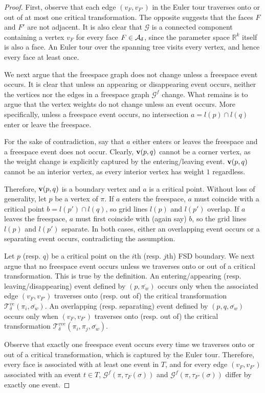\documentclass[thm-restate]{lipics-v2021}
\theoremstyle{remark}
\newcommand{\graph}[0]{\mathcal{G}}
\newcommand{\reals}[0]{\mathbb{R}}
\newcommand{\vertex}[1]{\normalfont \textbf{v}(#1)}
\newcommand{\fsgraph}[0]{\graph^{f}}
\newcommand{\vvetrans}[0]{\mathcal{T}^{vve}_\delta}
\newcommand{\vetrans}[0]{\mathcal{T}^{ve}_\delta}
\newcommand{\cseg}[1]{\overline{#1}}
\begin{document}
\begin{proof}
    First, observe that each edge $(v_F, v_{F'})$ in the Euler tour traverses onto or out of at most one critical transformation. The opposite suggests that the faces $F$ and $F'$ are not adjacent. It is also clear that $\graph$ is a connected component containing a vertex $v_F$ for every face $F \in \mathcal{A_\delta}$, since the parameter space $\reals^k$ itself is also a face. An Euler tour over the spanning tree visits every vertex, and hence every face at least once. 

    We next argue that the freespace graph does not change unless a freespace event occurs. It is clear that unless an appearing or disappearing event occurs, neither the vertices nor the edges in a freespace graph $\fsgraph$ change. What remains is to argue that the vertex weights do not change unless an event occurs. More specifically, unless a freespace event occurs, no intersection $a = l(p) \cap l(q)$ enter or leave the freespace. 

    For the sake of contradiction, say that $a$ either enters or leaves the freespace and a freespace event does not occur. Clearly, $\vertex{p, q}$ cannot be a corner vertex, as the weight change is explicitly captured by the entering/leaving event. $\vertex{p, q}$ cannot be an interior vertex, as every interior vertex has weight $1$ regardless. 
    
    Therefore, $\vertex{p, q}$ is a boundary vertex and $a$ is a critical point. Without loss of generality, let $p$ be a vertex of $\pi$. If $a$ enters the freespace, $a$ must coincide with a critical point $b = l(p') \cap l(q)$, so grid lines $l(p)$ and $l(p')$ overlap. If $a$ leaves the freespace, $a$ must first coincide with (again say) $b$, so the grid lines $l(p)$ and $l(p')$ separate. In both cases, either an overlapping event occurs or a separating event occurs, contradicting the assumption. 

    Let $p$ (resp. $q$) be a critical point on the $i$th (resp. $j$th) FSD boundary. We next argue that no freespace event occurs unless we traverses onto or out of a critical transformation. This is true by the definition. An entering/appearing (resp. leaving/disappearing) event defined by $(p, \cseg{\pi_w})$ occurs only when the associated edge $(v_F, v_{F'})$ traverses onto (resp. out of) the critical transformation $\vetrans(\pi_i, \cseg{\sigma_w})$. An overlapping (resp. separating) event defined by $(p, q, \cseg{\sigma_w})$ occurs only when $(v_F, v_{F'})$ traverses onto (resp. out of) the critical transformation $\vvetrans(\pi_i, \pi_j, \cseg{\sigma_w})$.  
    
    Observe that exactly one freespace event occurs every time we traverses onto or out of a critical transformation, which is captured by the Euler tour. Therefore, every face is associated with at least one event in $T$, and for every edge $(v_F, v_{F'})$ associated with an event $t \in T$, $\fsgraph(\pi, \tau_F(\sigma))$ and $\fsgraph(\pi, \tau_{F'}(\sigma))$ differ by exactly one event. 
\end{proof}
\end{document}
